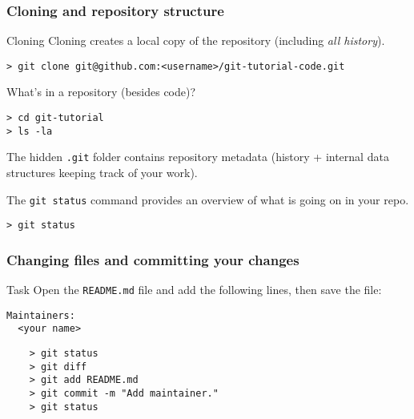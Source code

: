 
\begin{frame}[fragile]

\frametitle{Cloning and repository structure}

\begin{block}{Cloning}
Cloning creates a local copy of the repository (including \emph{all history}).	
\begin{verbatim}
> git clone git@github.com:<username>/git-tutorial-code.git
\end{verbatim}
\end{block}

What's in a repository (besides code)?
	
\begin{verbatim}
> cd git-tutorial
> ls -la
\end{verbatim}
	
The hidden \texttt{.git} folder contains repository metadata (history + internal data structures keeping track of your work).
	
The \texttt{git status} command provides an overview of what is going on in your repo.
\begin{verbatim}
> git status
\end{verbatim}
	
\end{frame}


\begin{frame}[fragile]
	\frametitle{Changing files and committing your changes}
	
	\begin{block}{Task}
	Open the \texttt{README.md} file and add the following lines, then save the file:
	\begin{verbatim}
Maintainers:
  <your name>
	\end{verbatim}
	\end{block}
	
	\begin{verbatim}
	> git status
	> git diff
	> git add README.md
	> git commit -m "Add maintainer."
	> git status
	\end{verbatim}


	
\end{frame}

